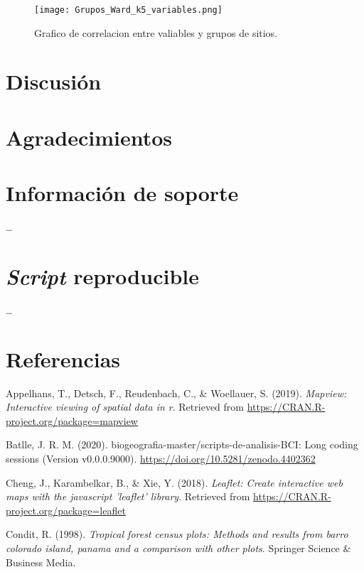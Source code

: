\documentclass[11pt,]{article}
\begin{document}
\begin{figure}
\centering
\texttt{[image: Grupos\_Ward\_k5\_variables.png]}
\caption{Grafico de correlacion entre valiables y grupos de sitios.
\label{fig:Grupos_Ward_k5_variables}}
\end{figure}

\section{Discusión}\label{discusiuxf3n}

\section{Agradecimientos}\label{agradecimientos}

\section{Información de soporte}\label{informaciuxf3n-de-soporte}

\ldots

\section{\texorpdfstring{\emph{Script}
reproducible}{Script reproducible}}\label{script-reproducible}

\ldots

\section*{Referencias}\label{referencias}

\hypertarget{refs}{}
\hypertarget{ref-MapView}{}
Appelhans, T., Detsch, F., Reudenbach, C., \& Woellauer, S. (2019).
\emph{Mapview: Interactive viewing of spatial data in r}. Retrieved from
\url{https://CRAN.R-project.org/package=mapview}

\hypertarget{ref-jose_ramon_martinez_batlle_2020_4402362}{}
Batlle, J. R. M. (2020). biogeografia-master/scripts-de-analisis-BCI:
Long coding sessions (Version v0.0.0.9000).
\url{https://doi.org/10.5281/zenodo.4402362}

\hypertarget{ref-Leaflet}{}
Cheng, J., Karambelkar, B., \& Xie, Y. (2018). \emph{Leaflet: Create
interactive web maps with the javascript 'leaflet' library}. Retrieved
from \url{https://CRAN.R-project.org/package=leaflet}

\hypertarget{ref-condit1998tropical}{}
Condit, R. (1998). \emph{Tropical forest census plots: Methods and
results from barro colorado island, panama and a comparison with other
plots}. Springer Science \& Business Media.
\end{document}
